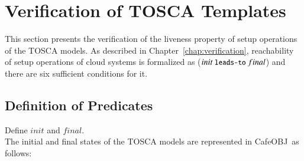 \documentclass[12pt]{report}
\newcommand{\mbstt}[1]{\mbox{\small{\tt {#1}}}}
\newcommand{\cafeobj}{{\sf CafeOBJ}~}
\begin{document}
\section{Verification of TOSCA Templates}
\label{sec:TOSCAverification}
This section presents the verification of the liveness property of
setup operations of the TOSCA models. As described in
Chapter~\ref{chap:verification}, reachability of setup operations of
cloud systems is formalized as ($init~\mbstt{leads-to}~final$) and
there are six sufficient conditions for it.

\subsection{Definition of Predicates}
\label{sec:TOSCAsupport}
 Define $init$ and $final$. \\
The initial and final states of the TOSCA models are represented in
\cafeobj as follows:
\small
\end{document}
